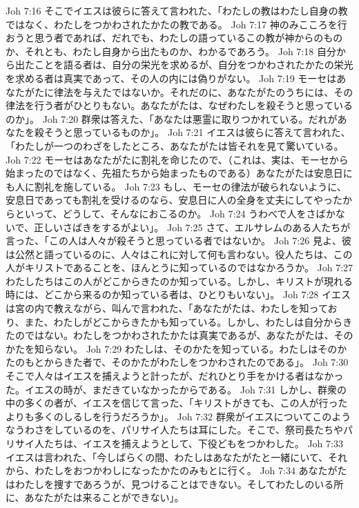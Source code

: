 Joh 7:16  そこでイエスは彼らに答えて言われた、「わたしの教はわたし自身の教ではなく、わたしをつかわされたかたの教である。
Joh 7:17  神のみこころを行おうと思う者であれば、だれでも、わたしの語っているこの教が神からのものか、それとも、わたし自身から出たものか、わかるであろう。
Joh 7:18  自分から出たことを語る者は、自分の栄光を求めるが、自分をつかわされたかたの栄光を求める者は真実であって、その人の内には偽りがない。
Joh 7:19  モーセはあなたがたに律法を与えたではないか。それだのに、あなたがたのうちには、その律法を行う者がひとりもない。あなたがたは、なぜわたしを殺そうと思っているのか」。
Joh 7:20  群衆は答えた、「あなたは悪霊に取りつかれている。だれがあなたを殺そうと思っているものか」。
Joh 7:21  イエスは彼らに答えて言われた、「わたしが一つのわざをしたところ、あなたがたは皆それを見て驚いている。
Joh 7:22  モーセはあなたがたに割礼を命じたので、（これは、実は、モーセから始まったのではなく、先祖たちから始まったものである）あなたがたは安息日にも人に割礼を施している。
Joh 7:23  もし、モーセの律法が破られないように、安息日であっても割礼を受けるのなら、安息日に人の全身を丈夫にしてやったからといって、どうして、そんなにおこるのか。
Joh 7:24  うわべで人をさばかないで、正しいさばきをするがよい」。
Joh 7:25  さて、エルサレムのある人たちが言った、「この人は人々が殺そうと思っている者ではないか。
Joh 7:26  見よ、彼は公然と語っているのに、人々はこれに対して何も言わない。役人たちは、この人がキリストであることを、ほんとうに知っているのではなかろうか。
Joh 7:27  わたしたちはこの人がどこからきたのか知っている。しかし、キリストが現れる時には、どこから来るのか知っている者は、ひとりもいない」。
Joh 7:28  イエスは宮の内で教えながら、叫んで言われた、「あなたがたは、わたしを知っており、また、わたしがどこからきたかも知っている。しかし、わたしは自分からきたのではない。わたしをつかわされたかたは真実であるが、あなたがたは、そのかたを知らない。
Joh 7:29  わたしは、そのかたを知っている。わたしはそのかたのもとからきた者で、そのかたがわたしをつかわされたのである」。
Joh 7:30  そこで人々はイエスを捕えようと計ったが、だれひとり手をかける者はなかった。イエスの時が、まだきていなかったからである。
Joh 7:31  しかし、群衆の中の多くの者が、イエスを信じて言った、「キリストがきても、この人が行ったよりも多くのしるしを行うだろうか」。
Joh 7:32  群衆がイエスについてこのようなうわさをしているのを、パリサイ人たちは耳にした。そこで、祭司長たちやパリサイ人たちは、イエスを捕えようとして、下役どもをつかわした。
Joh 7:33  イエスは言われた、「今しばらくの間、わたしはあなたがたと一緒にいて、それから、わたしをおつかわしになったかたのみもとに行く。
Joh 7:34  あなたがたはわたしを捜すであろうが、見つけることはできない。そしてわたしのいる所に、あなたがたは来ることができない」。
